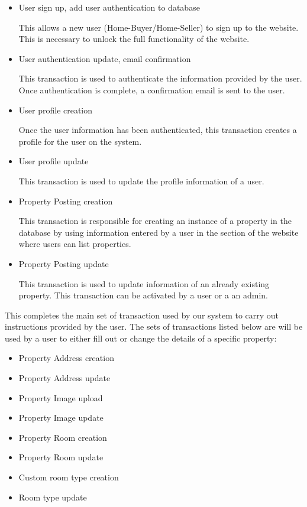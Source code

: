 \documentclass[12pt,a4paper]{report}
\begin{document}
\begin{itemize} 
\item User sign up, add user authentication to database \par 
This allows a new user (Home-Buyer/Home-Seller) to sign up to the website. This is necessary to unlock the full functionality of the website.

\item User authentication update, email confirmation \par 
This transaction is used to authenticate the information provided by the user. Once authentication is complete, a confirmation email is sent to the user.

\item User profile creation \par 
Once the user information has been authenticated, this transaction creates a profile for the user on the system. 

\item User profile update \par 
This transaction is used to update the profile information of a user. 

\item Property Posting creation \par 
This transaction is responsible for creating an instance of a property in the database by using information entered by a user in the section of the website where users can list properties. 

\item Property Posting update \par 
This transaction is used to update information of an already existing property. This transaction can be activated by a user or a an admin. 

\end{itemize}

This completes the main set of transaction used by our system to carry out instructions provided by the user. The sets of transactions listed below are will be used by a user to either fill out or change the details of a specific property:

\begin{itemize}
\item Property Address creation
\item Property Address update
\item Property Image upload
\item Property Image update
\item Property Room creation
\item Property Room update
\item Custom room type creation
\item Room type update
\end{itemize}
\end{document}
